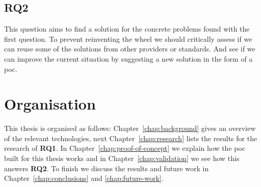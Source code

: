 \subsection{RQ2}
\label{subsec:rq2}
This question aims to find a solution for the concrete problems found with the first question. To prevent reinventing the wheel we should critically assess if we can reuse some of the solutions from other providers or standards. And see if we can improve the current situation by suggesting a new solution in the form of a \gls{poc}.

\section{Organisation}
\label{sec:organisation}
This thesis is organised as follows: Chapter~\ref{chap:background} gives an overview of the relevant technologies, next Chapter~\ref{chap:research} lists the results for the research of \textbf{RQ1}. In Chapter~\ref{chap:proof-of-concept} we explain how the \gls{poc} built for this thesis works and in Chapter~\ref{chap:validation} we see how this answers \textbf{RQ2}. To finish we discuss the results and future work in Chapter~\ref{chap:conclusions} and \ref{chap:future-work}.
